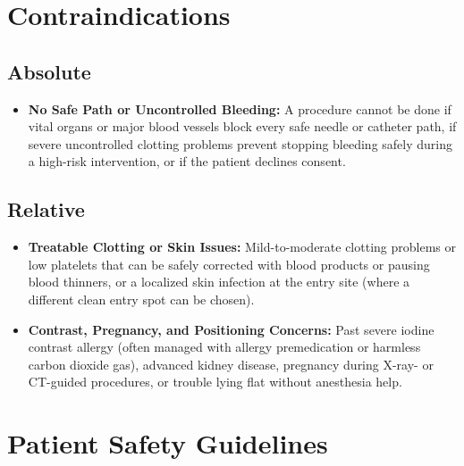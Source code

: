 \section{Contraindications}

\subsection{Absolute}

\begin{itemize}
    \item \textbf{No Safe Path or Uncontrolled Bleeding:} A procedure cannot be done if vital organs or major blood vessels block every safe needle or catheter path, if severe uncontrolled clotting problems prevent stopping bleeding safely during a high-risk intervention, or if the patient declines consent.
\end{itemize}

\subsection{Relative}

\begin{itemize}
    \item \textbf{Treatable Clotting or Skin Issues:} Mild-to-moderate clotting problems or low platelets that can be safely corrected with blood products or pausing blood thinners, or a localized skin infection at the entry site (where a different clean entry spot can be chosen).
    \item \textbf{Contrast, Pregnancy, and Positioning Concerns:} Past severe iodine contrast allergy (often managed with allergy premedication or harmless carbon dioxide gas), advanced kidney disease, pregnancy during X-ray- or CT-guided procedures, or trouble lying flat without anesthesia help.
\end{itemize}

\section{Patient Safety Guidelines}

